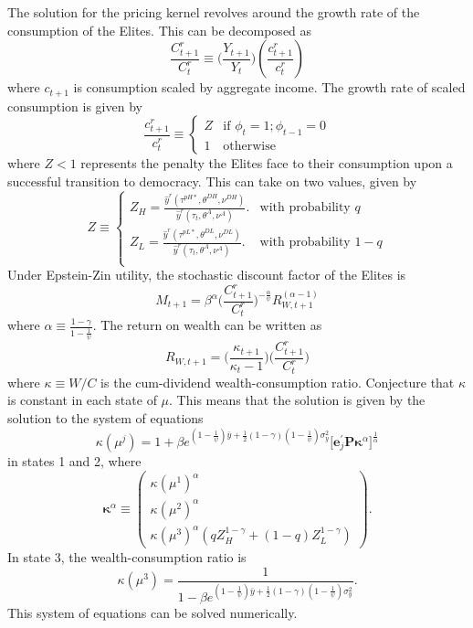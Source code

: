 \documentclass[12pt]{article}
\numberwithin{equation}{section}
\begin{document}
The solution for the pricing kernel revolves around the growth rate of the consumption of the Elites. This can be decomposed as
\begin{equation}
\frac{C_{t+1}^r}{C_{t}^r} \equiv \bigg(\frac{Y_{t+1}}{Y_{t}}\bigg)\left(\frac{c_{t+1}^{r}}{c_{t}^{r}}\right)
\end{equation}
where $c_{t+1}$ is consumption scaled by aggregate income. The growth rate of scaled consumption is given by
\begin{equation}
\frac{c_{t+1}^{r}}{c_{t}^{r}}\equiv \begin{cases} 
Z & \textrm{if }\phi_{t}=1;\phi_{t-1}=0 \\
1 & \textrm{otherwise}
\end{cases} 
\end{equation}
where $Z<1$ represents the penalty the Elites face to their consumption upon a successful transition to democracy. This can take on two values, given by
\begin{equation}
Z \equiv \begin{cases} 
 Z_H = \frac{\hat{y}^{r} (\tau^{pH*},\theta^{DH},\nu^{DH})}{\hat{y}^{r} (\tau_t,\theta^{A},\nu^A)}. & \textrm{with probability }q \\
 Z_L = \frac{\hat{y}^{r} (\tau^{pL*},\theta^{DL},\nu^{DL})}{\hat{y}^{r} (\tau_t,\theta^{A},\nu^A)}. & \textrm{with probability } 1-q \\
\end{cases} 
\end{equation}
Under Epstein-Zin utility, the stochastic discount factor of the Elites is
\[
M_{t+1}=\beta^{\alpha}\bigg(\frac{C_{t+1}^r}{C_{t}^r}\bigg)^{-\frac{\alpha}{\psi}}R_{W,t+1}^{(\alpha-1)}
\]
where $\alpha \equiv \frac{1-\gamma}{1-\frac{1}{\psi}}$. The return on wealth can be written as
\begin{equation}
R_{W,t+1} = \bigg(\frac{\kappa_{t+1}}{\kappa_t - 1}\bigg)\bigg(\frac{C_{t+1}^r}{C_{t}^r}\bigg)
\end{equation}
where $\kappa \equiv W/C$ is the cum-dividend wealth-consumption ratio. Conjecture that $\kappa$ is constant in each state of $\mu$. This means that the solution is given by the solution to the system of equations
\begin{equation}
\kappa(\mu^j)=1+\beta e^{(1-\frac{1}{\psi})\bar{y}+\frac{1}{2}(1-\gamma)(1-\frac{1}{\psi})\sigma_y^2} \bigg[\mathbf{e}_j^\prime \mathbf{P}\boldsymbol\kappa^{\alpha}\bigg]^{\frac{1}{\alpha}}
\end{equation}
in states 1 and 2, where
\begin{equation}
\boldsymbol{\kappa}^{\alpha}\equiv\begin{pmatrix}\kappa(\mu^{1})^{\alpha}\\
\kappa(\mu^{2})^{\alpha}\\
\kappa(\mu^{3})^{\alpha}(qZ_H^{1-\gamma} + (1-q)Z_L^{1-\gamma})
\end{pmatrix}.
\end{equation}
In state 3, the wealth-consumption ratio is
$$
\kappa(\mu^{3})=\frac{1}{1-\beta e^{(1-\frac{1}{\psi})\bar{y}+\frac{1}{2}(1-\gamma)(1-\frac{1}{\psi})\sigma_y^{2}}}.
$$
This system of equations can be solved numerically.
\end{document}
